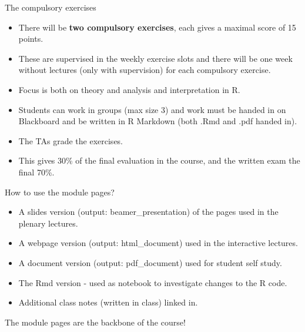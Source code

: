 \documentclass[ignorenonframetext,]{beamer}
\providecommand{\tightlist}{%
  \setlength{\itemsep}{0pt}\setlength{\parskip}{0pt}}
\begin{document}
\begin{frame}

\begin{block}{The compulsory exercises}

\begin{itemize}
\tightlist
\item
  There will be \textbf{two compulsory exercises}, each gives a maximal
  score of 15 points.
\item
  These are supervised in the weekly exercise slots and there will be
  one week without lectures (only with supervision) for each compulsory
  exercise.
\item
  Focus is both on theory and analysis and interpretation in R.
\item
  Students can work in groups (max size 3) and work must be handed in on
  Blackboard and be written in R Markdown (both .Rmd and .pdf handed
  in).
\item
  The TAs grade the exercises.
\item
  This gives 30\% of the final evaluation in the course, and the written
  exam the final 70\%.
\end{itemize}

\end{block}

\end{frame}

\begin{frame}

\begin{block}{How to use the module pages?}

\begin{itemize}
\tightlist
\item
  A slides version (output: beamer\_presentation) of the pages used in
  the plenary lectures.
\item
  A webpage version (output: html\_document) used in the interactive
  lectures.
\item
  A document version (output: pdf\_document) used for student self
  study.
\item
  The Rmd version - used as notebook to investigate changes to the R
  code.
\item
  Additional class notes (written in class) linked in.
\end{itemize}

The module pages are the backbone of the course!

\end{block}

\end{frame}
\end{document}
